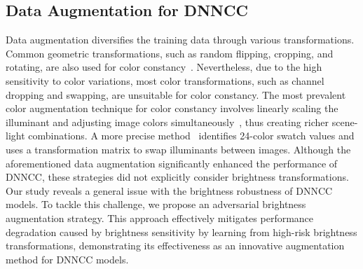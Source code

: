 \subsection{Data Augmentation for DNNCC} \label{sec2.3}
\par Data augmentation diversifies the training data through various transformations. Common geometric transformations, such as random flipping, cropping, and rotating, are also used for color constancy~\cite{hu2017fc4, yu2020cascading, xu2020end, lo2021clcc, hernandez2020multi}. Nevertheless, due to the high sensitivity to color variations, most color transformations, such as channel dropping and swapping, are unsuitable for color constancy. The most prevalent color augmentation technique for color constancy involves linearly scaling the illuminant and adjusting image colors simultaneously~\cite{hu2017fc4}, thus creating richer scene-light combinations. A more precise method~\cite{lo2021clcc} identifies 24-color swatch values and uses a transformation matrix to swap illuminants between images.
Although the aforementioned data augmentation significantly enhanced the performance of DNNCC, these strategies did not explicitly consider brightness transformations. Our study reveals a general issue with the brightness robustness of DNNCC models. To tackle this challenge, we propose an adversarial brightness augmentation strategy. This approach effectively mitigates performance degradation caused by brightness sensitivity by learning from high-risk brightness transformations, demonstrating its effectiveness as an innovative augmentation method for DNNCC models.
